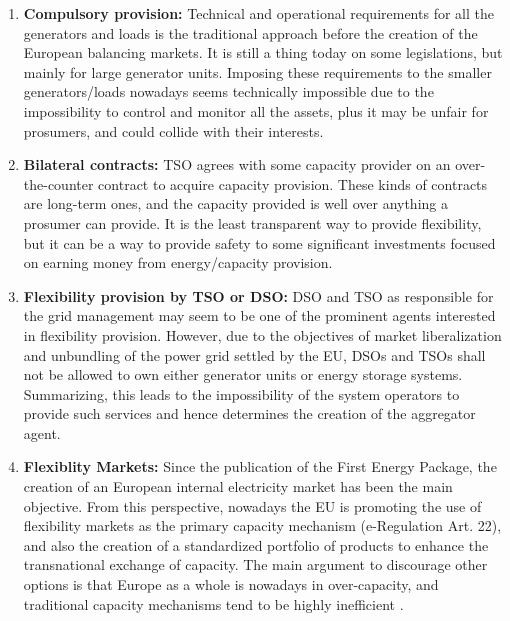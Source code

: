 \begin{enumerate}
\item \textbf{Compulsory provision:} Technical and operational requirements for all the generators and loads is the traditional approach before the creation of the European balancing markets. It is still a thing today on some legislations, but mainly for large generator units. Imposing these requirements to the smaller generators/loads nowadays seems technically impossible due to the impossibility to control and monitor all the assets, plus it may be unfair for prosumers, and could collide with their interests.
\item \textbf{Bilateral contracts:} TSO agrees with some capacity provider on an over-the-counter contract to acquire capacity provision. These kinds of contracts are long-term ones, and the capacity provided is well over anything a prosumer can provide. It is the least transparent way to provide flexibility, but it can be a way to provide safety to some significant investments focused on earning money from energy/capacity provision. 
\item  \textbf{Flexibility provision by TSO or DSO:} DSO and TSO as responsible for the grid management may seem to be one of the prominent agents interested in flexibility provision. However, due to the objectives of market liberalization and unbundling of the power grid settled by the EU, DSOs and TSOs shall not be allowed to own either generator units or energy storage systems. Summarizing, this leads to the impossibility of the system operators to provide such services and hence determines the creation of the aggregator agent.  
\item  \textbf{Flexiblity Markets:} Since the publication of the First Energy Package, the creation of an European internal electricity market has been the main objective. From this perspective, nowadays the EU is promoting the use of flexibility markets as the primary capacity mechanism \cite{Directive2019943} (e-Regulation Art. 22), and also the creation of a standardized portfolio of products to enhance the transnational exchange of capacity. The main argument to discourage other options is that Europe as a whole is nowadays in over-capacity, and traditional capacity mechanisms tend to be highly inefficient \cite{Hancher2017, validzic2017clean}.
\end{enumerate}

